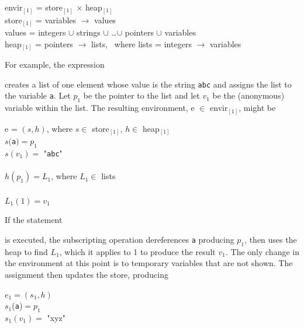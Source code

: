 \goodbreak
\begin{specialcode}{}
\>envir$_{[1]}$ = store$_{[1]}$ $\times$ heap$_{[1]}$\\
\>store$_{[1]}$ = variables $\rightarrow$ values\\
\>values       = integers $\cup$ strings $\cup$ \ldots $\cup$ pointers $\cup$ variables\\
\>heap$_{[1]}$  = pointers \textrm{${\rightarrow}$} lists,~%
                 where lists = integers $\rightarrow$ variables\\
\end{specialcode}


For example, the expression 


\noindent creates a list of one element whose value is the string \texttt{abc}
and assigns the list to the variable \texttt{a}. Let $p_1$ be the
pointer to the list and let $v_1$ be the (anonymous) variable within
the list. The resulting environment, e $\in$ envir$_{[1]}$, might be

\goodbreak
\begin{specialcode}{}
\>e = $(s,h)$, where $s \in $ store$_{[1]}$, $h \in $ heap$_{[1]}$\\
\>$s($\texttt{a}$) = p_1$\\
\>$s(v_1) = $ "\texttt{abc}"\\
\\
\>$h(p_1) = L_1$, where $L_1 \in$ lists\\
\\
\>$L_1(1) = v_1$\\
\end{specialcode}

\noindent
If the statement 



\noindent is executed, the subscripting operation dereferences \texttt{a}
producing $p_1$, then uses the heap to find $L_1$, which it applies to
1 to produce the result $v_1$. The only change in the environment at
this point is to temporary variables that are not shown. The
assignment then updates the store, producing

\goodbreak
\begin{iconcode}
\>$e_1 = (s_1 , h)$\\
\>$s_1$(\texttt{a})$ = p_1$\\
\>$s_1(v_1) =$ "xyz"\\
\end{iconcode}

